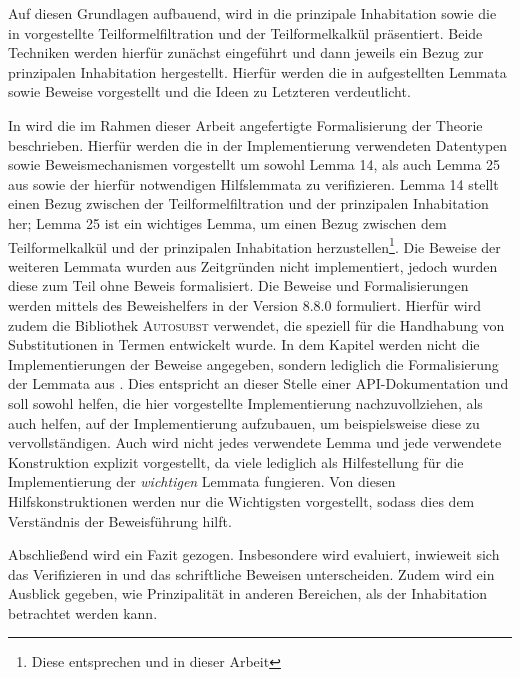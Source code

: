 Auf diesen Grundlagen aufbauend, wird in  die prinzipale Inhabitation sowie die in \cite{dudenhefner} vorgestellte Teilformelfiltration und der Teilformelkalkül präsentiert. Beide Techniken werden hierfür zunächst eingeführt und dann jeweils ein Bezug zur prinzipalen Inhabitation hergestellt. Hierfür werden die in \cite{dudenhefner} aufgestellten Lemmata sowie Beweise vorgestellt und die Ideen zu Letzteren verdeutlicht.

In  wird die im Rahmen dieser Arbeit angefertigte Formalisierung der Theorie beschrieben. Hierfür werden die in der Implementierung verwendeten Datentypen sowie Beweismechanismen vorgestellt um sowohl Lemma 14, als auch Lemma 25 aus \cite{dudenhefner} sowie der hierfür notwendigen Hilfslemmata zu verifizieren. Lemma 14 stellt einen Bezug zwischen der Teilformelfiltration und der prinzipalen Inhabitation her; Lemma 25 ist ein wichtiges Lemma, um einen Bezug zwischen dem Teilformelkalkül und der prinzipalen Inhabitation herzustellen\footnote{Diese entsprechen  und  in dieser Arbeit}. Die Beweise der weiteren Lemmata wurden aus Zeitgründen nicht implementiert, jedoch wurden diese zum Teil ohne Beweis formalisiert. Die Beweise und Formalisierungen werden mittels des Beweishelfers \coq{} in der Version 8.8.0 formuliert. Hierfür wird zudem die Bibliothek \textsc{Autosubst} verwendet, die speziell für die Handhabung von Substitutionen in Termen entwickelt wurde. In dem Kapitel werden nicht die Implementierungen der Beweise angegeben, sondern lediglich die Formalisierung der Lemmata aus . Dies entspricht an dieser Stelle einer API-Dokumentation und soll sowohl helfen, die hier vorgestellte Implementierung nachzuvollziehen, als auch helfen, auf der Implementierung aufzubauen, um beispielsweise diese zu vervollständigen. Auch wird nicht jedes verwendete Lemma und jede verwendete Konstruktion explizit vorgestellt, da viele lediglich als Hilfestellung für die Implementierung der \emph{wichtigen} Lemmata fungieren. Von diesen Hilfskonstruktionen werden nur die Wichtigsten vorgestellt, sodass dies dem Verständnis der Beweisführung hilft.

Abschließend wird ein Fazit gezogen. Insbesondere wird evaluiert, inwieweit sich das Verifizieren in \coq{} und das schriftliche Beweisen unterscheiden. Zudem wird ein Ausblick gegeben, wie Prinzipalität in anderen Bereichen, als der Inhabitation betrachtet werden kann.